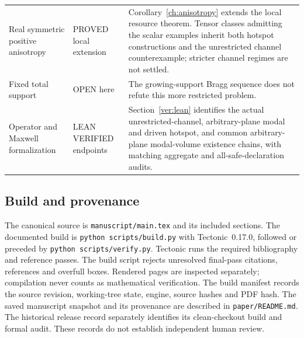 \begin{longtable}{@{}p{}p{}p{}@{}}
Real symmetric positive anisotropy & PROVED local extension & Corollary~\ref{ch:anisotropy} extends the local resource theorem. Tensor classes admitting the scalar examples inherit both hotspot constructions and the unrestricted channel counterexample; stricter channel regimes are not settled.\\[3pt]
Fixed total support & OPEN here & The growing-support Bragg sequence does not refute this more restricted problem.\\
Operator and Maxwell formalization & LEAN VERIFIED endpoints & Section~\ref{ver:lean} identifies the actual unrestricted-channel, arbitrary-plane modal and driven hotspot, and common arbitrary-plane modal-volume existence chains, with matching aggregate and all-safe-declaration audits.\\
\bottomrule
\end{longtable}

\subsection{Build and provenance}
The canonical source is \texttt{manuscript/main.tex} and its included
sections. The documented build is \texttt{python scripts/build.py}
with Tectonic~0.17.0, followed or preceded by
\texttt{python scripts/verify.py}. Tectonic runs the required bibliography
and reference passes. The build script rejects unresolved final-pass
citations, references and overfull boxes. Rendered pages are inspected
separately; compilation never counts as mathematical verification.
The build manifest records the source revision, working-tree state, engine,
source hashes and PDF hash. The saved manuscript snapshot and its
provenance are described in \texttt{paper/README.md}. The historical
release record separately identifies its clean-checkout build and formal
audit. These records do not establish independent human review.
